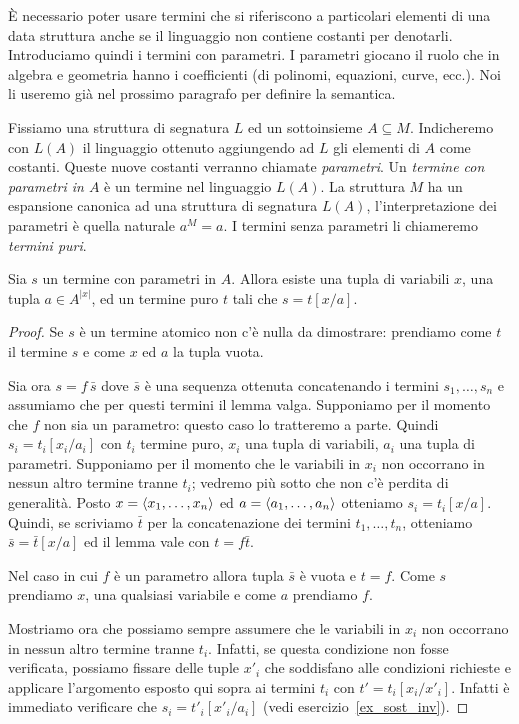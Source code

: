 \`E necessario poter usare termini che si riferiscono a particolari elementi di una data struttura anche se il linguaggio non contiene costanti per denotarli. Introduciamo quindi i termini con parametri. I parametri giocano il ruolo che in algebra e geometria hanno i coefficienti (di polinomi, equazioni, curve, ecc.). Noi li useremo gi\`a nel prossimo paragrafo per definire la semantica. 

Fissiamo una struttura di segnatura $L$ ed un sottoinsieme $A\subseteq M$. Indicheremo con \emph{$L(A)$\/} il linguaggio ottenuto aggiungendo ad $L$ gli elementi di $A$ come costanti. Queste nuove costanti verranno chiamate \emph{parametri}. Un \emph{termine con parametri in $A$\/} \`e un termine nel linguaggio $L(A)$.  La struttura $M$ ha un espansione canonica ad una struttura di segnatura $L(A)$, l'interpretazione dei parametri \`e quella naturale $a^M=a$. I termini senza parametri li chiameremo \emph{termini puri}.

\begin{lemma}\label{rappresentazione termini con parametri}
Sia $s$ un termine con parametri in $A$. Allora esiste una tupla  di variabili $x$, una tupla $a\in A^{|x|}$, ed un termine puro $t$ tali che $s=t[x/a]$.
\end{lemma}

\begin{proof}
Se $s$ \`e un termine atomico non c'\`e nulla da dimostrare: prendiamo come $t$ il termine $s$ e come $x$ ed $a$ la tupla vuota.

Sia ora $s=f\,\bar s$ dove $\bar s$ \`e una sequenza ottenuta concatenando i termini $s_1,\dots,s_n$ e assumiamo che per questi termini il lemma valga. Supponiamo per il momento che $f$ non sia un parametro: questo caso lo tratteremo a parte. Quindi $s_i=t_i[x_i/a_i]$ con $t_i$ termine puro, $x_i$ una tupla di variabili, $a_i$ una tupla di parametri. Supponiamo per il momento che le variabili in $x_i$ non occorrano in nessun altro termine tranne $t_i$; vedremo pi\`u sotto che non c'\`e perdita di generalit\`a. Posto $x=\langle x_1,\dots,x_n\rangle$ ed $a=\langle a_1,\dots,a_n\rangle$ otteniamo $s_i=t_i[x/a]$. Quindi, se scriviamo  $\bar t$ per la concatenazione dei termini $t_1,\dots,t_n$, otteniamo $\bar s=\bar t[x/a]$ ed il lemma vale con $t=f\bar t$.

Nel caso in cui $f$ \`e un parametro allora tupla $\bar s$ \`e vuota e $t=f$. Come $s$ prendiamo $x$, una qualsiasi variabile e come $a$ prendiamo $f$.

Mostriamo ora che possiamo sempre assumere che le variabili in $x_i$ non occorrano in nessun altro termine tranne $t_i$. Infatti, se questa condizione non fosse verificata, possiamo fissare delle tuple $x'_i$ che soddisfano alle condizioni richieste e applicare l'argomento esposto qui sopra ai termini $t_i$ con $t'=t_i[x_i/x'_i]$. Infatti \`e immediato verificare che $s_i=t'_i[x'_i/a_i]$ (vedi esercizio~\ref{ex_sost_inv}).
\end{proof}

